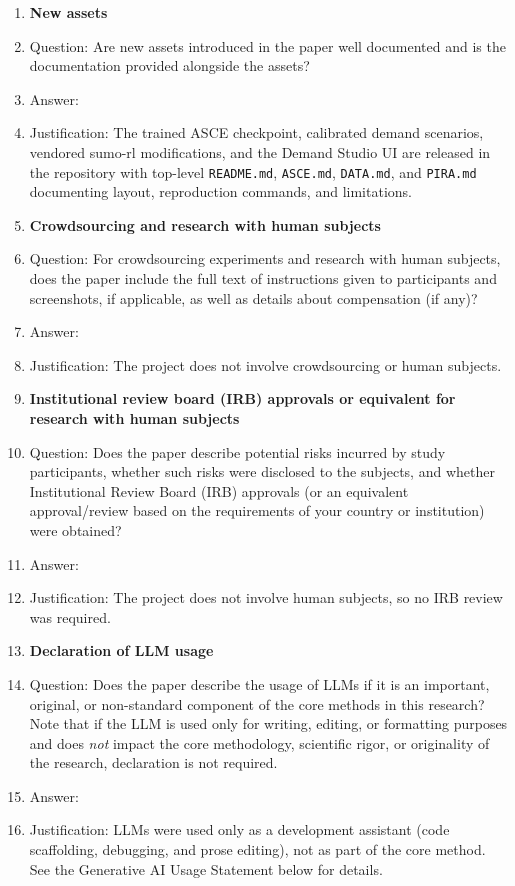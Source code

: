\documentclass{article}
\begin{document}
\begin{enumerate}
\item {\bf New assets}
    \item[] Question: Are new assets introduced in the paper well documented and is the documentation provided alongside the assets?
    \item[] Answer: \answerYes{}
    \item[] Justification: The trained ASCE checkpoint, calibrated demand scenarios, vendored sumo-rl modifications, and the Demand Studio UI are released in the repository with top-level \texttt{README.md}, \texttt{ASCE.md}, \texttt{DATA.md}, and \texttt{PIRA.md} documenting layout, reproduction commands, and limitations.

\item {\bf Crowdsourcing and research with human subjects}
    \item[] Question: For crowdsourcing experiments and research with human subjects, does the paper include the full text of instructions given to participants and screenshots, if applicable, as well as details about compensation (if any)?
    \item[] Answer: \answerNA{}
    \item[] Justification: The project does not involve crowdsourcing or human subjects.

\item {\bf Institutional review board (IRB) approvals or equivalent for research with human subjects}
    \item[] Question: Does the paper describe potential risks incurred by study participants, whether such risks were disclosed to the subjects, and whether Institutional Review Board (IRB) approvals (or an equivalent approval/review based on the requirements of your country or institution) were obtained?
    \item[] Answer: \answerNA{}
    \item[] Justification: The project does not involve human subjects, so no IRB review was required.

\item {\bf Declaration of LLM usage}
    \item[] Question: Does the paper describe the usage of LLMs if it is an important, original, or non-standard component of the core methods in this research? Note that if the LLM is used only for writing, editing, or formatting purposes and does \emph{not} impact the core methodology, scientific rigor, or originality of the research, declaration is not required.
    \item[] Answer: \answerYes{}
    \item[] Justification: LLMs were used only as a development assistant (code scaffolding, debugging, and prose editing), not as part of the core method. See the Generative AI Usage Statement below for details.

\end{enumerate}
\end{document}
